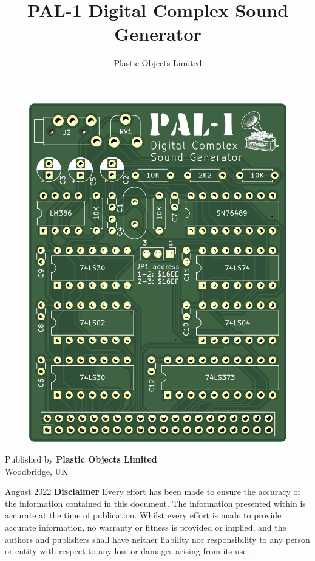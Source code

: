 \documentclass[a4paper,11pt,twoside,openright]{report}
\title{PAL-1 Digital Complex Sound Generator}
\author{Plastic Objects Limited}
\date{}
\newcommand\frontmatter{
  \cleardoublepage
  \pagenumbering{roman}}
\begin{document}
\frontmatter
\begin{titlepage}
\begin{figure}[t]
\centering
\includegraphics[scale=0.2]{figures/sound.png}
\end{figure}
\maketitle			
\end{titlepage}
\clearpage
\noindent Published by \textbf{Plastic Objects Limited} \\
Woodbridge, UK

\bigskip
\noindent August 2022
\vfill
{\noindent\Large\textbf{Disclaimer}}
\vskip 6pt
Every effort has been made to ensure the accuracy of the information contained in this document. The information presented 
within is accurate at the time of publication. Whilst every effort is made to provide accurate information, no warranty or 
fitness is provided or implied, and the authors and publishers shall have neither liability nor responsibility to any person 
or entity with respect to any loss or damages arising from its use.
\end{document}
